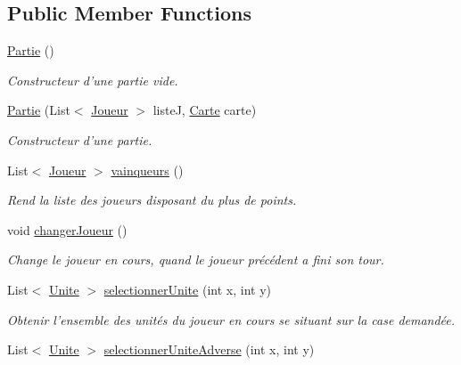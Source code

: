 \subsection*{Public Member Functions}
\begin{DoxyCompactItemize}
\item 
\hyperlink{class_small_world_1_1_partie_ac1d0d36741a739ed4de485ee8d0d75e9}{Partie} ()
\begin{DoxyCompactList}\small\item\em Constructeur d'une partie vide. \end{DoxyCompactList}\item 
\hyperlink{class_small_world_1_1_partie_aaae43a77544d761eb727bf779afba13a}{Partie} (List$<$ \hyperlink{class_small_world_1_1_joueur}{Joueur} $>$ liste\-J, \hyperlink{class_small_world_1_1_carte}{Carte} carte)
\begin{DoxyCompactList}\small\item\em Constructeur d'une partie. \end{DoxyCompactList}\item 
List$<$ \hyperlink{class_small_world_1_1_joueur}{Joueur} $>$ \hyperlink{class_small_world_1_1_partie_aaf0f50bb8fc7f2841a073f9536579561}{vainqueurs} ()
\begin{DoxyCompactList}\small\item\em Rend la liste des joueurs disposant du plus de points. \end{DoxyCompactList}\item 
void \hyperlink{class_small_world_1_1_partie_a3598df0afeeaa4b0cbf16c5ff8631264}{changer\-Joueur} ()
\begin{DoxyCompactList}\small\item\em Change le joueur en cours, quand le joueur précédent a fini son tour. \end{DoxyCompactList}\item 
List$<$ \hyperlink{class_small_world_1_1_unite}{Unite} $>$ \hyperlink{class_small_world_1_1_partie_ab652fc37c8e56f0b1d47d9b12878a04b}{selectionner\-Unite} (int x, int y)
\begin{DoxyCompactList}\small\item\em Obtenir l'ensemble des unités du joueur en cours se situant sur la case demandée. \end{DoxyCompactList}\item 
List$<$ \hyperlink{class_small_world_1_1_unite}{Unite} $>$ \hyperlink{class_small_world_1_1_partie_a78b2a635ab41467c0458172d465bd00a}{selectionner\-Unite\-Adverse} (int x, int y)

\end{DoxyCompactItemize}
